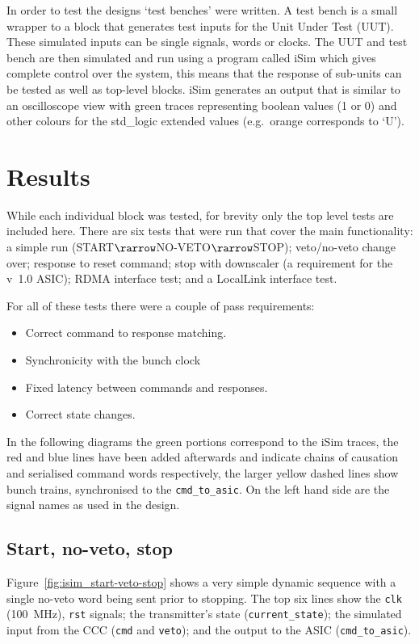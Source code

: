 In order to test the designs `test benches' were written. A test bench is a small wrapper to a block that generates test inputs for the Unit Under Test (UUT). These simulated inputs can be single signals, words or clocks. The UUT and test bench are then simulated and run using a program called iSim which gives complete control over the system, this means that the response of sub-units can be tested as well as top-level blocks. iSim generates an output that is similar to an oscilloscope view with green traces representing boolean values (1 or 0) and other colours for the std\_logic extended values (e.g.\ orange corresponds to `U'). 

\section{Results} %
\label{sec:results}
While each individual block was tested, for brevity only the top level tests are included here. There are six tests that were run that cover the main functionality: a simple run (START\(\rarrow\)NO-VETO\(\rarrow\)STOP); veto/no-veto change over; response to reset command; stop with downscaler (a requirement for the v~1.0 ASIC); RDMA interface test; and a LocalLink interface test.

For all of these tests there were a couple of pass requirements:
\begin{itemize}
  \item Correct command to response matching.
  \item Synchronicity with the bunch clock
  \item Fixed latency between commands and responses. 
  \item Correct state changes.
\end{itemize}

In the following diagrams the green portions correspond to the iSim traces, the red and blue lines have been added afterwards and indicate chains of causation and serialised command words respectively, the larger yellow dashed lines show bunch trains, synchronised to the \texttt{cmd\_to\_asic}. On the left hand side are the signal names as used in the design.

\subsection{Start, no-veto, stop} %
\label{sec:start_no_veto_stop}
Figure~\ref{fig:isim_start-veto-stop} shows a very simple dynamic sequence with a single no-veto word being sent prior to stopping. The top six lines show the \texttt{clk} (100~MHz), \texttt{rst} signals; the transmitter's state (\texttt{current\_state}); the simulated input from the CCC (\texttt{cmd} and \texttt{veto}); and the output to the ASIC (\texttt{cmd\_to\_asic}).

